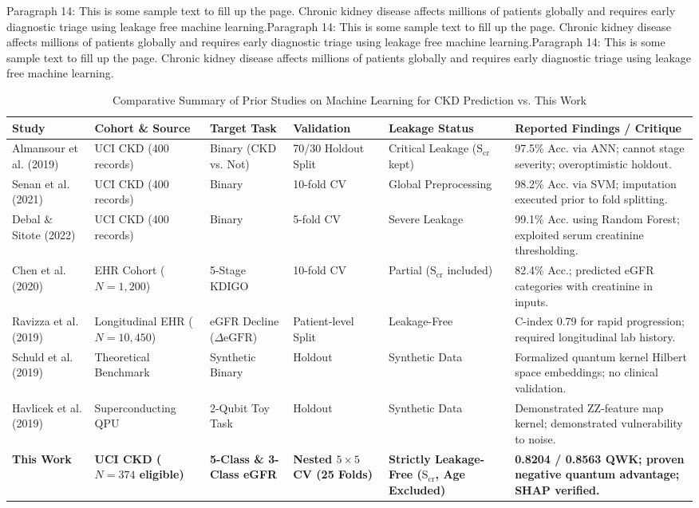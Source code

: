 \documentclass{IEEEtran}
\begin{document}
Paragraph 14: This is some sample text to fill up the page. Chronic kidney disease affects millions of patients globally and requires early diagnostic triage using leakage free machine learning.Paragraph 14: This is some sample text to fill up the page. Chronic kidney disease affects millions of patients globally and requires early diagnostic triage using leakage free machine learning.Paragraph 14: This is some sample text to fill up the page. Chronic kidney disease affects millions of patients globally and requires early diagnostic triage using leakage free machine learning.

\begin{table}[t]
\centering
\caption{Comparative Summary of Prior Studies on Machine Learning for CKD Prediction vs. This Work}
\label{tab:lit_comparison}
\renewcommand{\arraystretch}{1.15}
\begin{tabularx}{\textwidth}{lXllp{3.2cm}X}
\toprule
\textbf{Study} & \textbf{Cohort \& Source} & \textbf{Target Task} & \textbf{Validation} & \textbf{Leakage Status} & \textbf{Reported Findings / Critique} \\
\midrule
Almansour et al. (2019) & UCI CKD (400 records) & Binary (CKD vs. Not) & 70/30 Holdout Split & Critical Leakage ($\text{S}_{\text{cr}}$ kept) & 97.5\% Acc. via ANN; cannot stage severity; overoptimistic holdout. \\
Senan et al. (2021) & UCI CKD (400 records) & Binary & 10-fold CV & Global Preprocessing & 98.2\% Acc. via SVM; imputation executed prior to fold splitting. \\
Debal \& Sitote (2022) & UCI CKD (400 records) & Binary & 5-fold CV & Severe Leakage & 99.1\% Acc. using Random Forest; exploited serum creatinine thresholding. \\
Chen et al. (2020) & EHR Cohort ($N = 1,200$) & 5-Stage KDIGO & 10-fold CV & Partial ($\text{S}_{\text{cr}}$ included) & 82.4\% Acc.; predicted eGFR categories with creatinine in inputs. \\
Ravizza et al. (2019) & Longitudinal EHR ($N = 10,450$) & eGFR Decline ($\Delta\text{eGFR}$) & Patient-level Split & Leakage-Free & C-index 0.79 for rapid progression; required longitudinal lab history. \\
Schuld et al. (2019) & Theoretical Benchmark & Synthetic Binary & Holdout & Synthetic Data & Formalized quantum kernel Hilbert space embeddings; no clinical validation. \\
Havlicek et al. (2019) & Superconducting QPU & 2-Qubit Toy Task & Holdout & Synthetic Data & Demonstrated ZZ-feature map kernel; demonstrated vulnerability to noise. \\
\textbf{This Work} & \textbf{UCI CKD ($N = 374$ eligible)} & \textbf{5-Class \& 3-Class eGFR} & \textbf{Nested $5 \times 5$ CV (25 Folds)} & \textbf{Strictly Leakage-Free ($\text{S}_{\text{cr}}$, Age Excluded)} & \textbf{0.8204 / 0.8563 QWK; proven negative quantum advantage; SHAP verified.} \\
\bottomrule
\end{tabularx}
\end{table}
\end{document}

